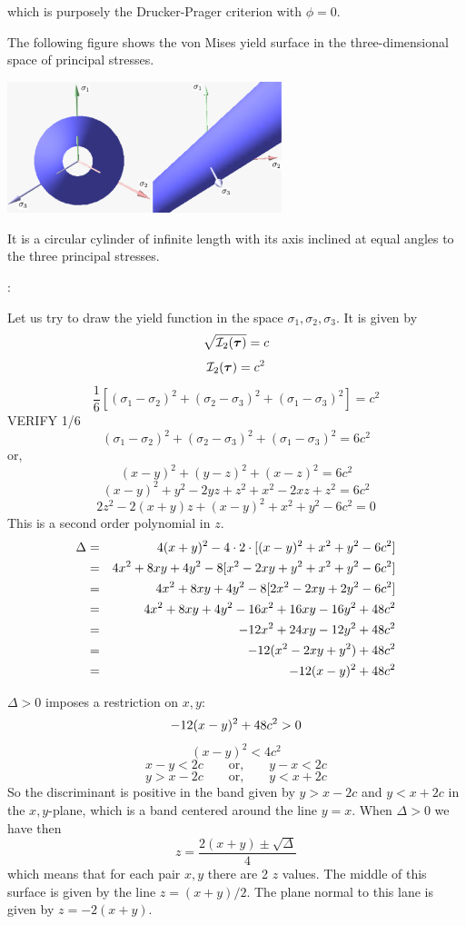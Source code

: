 which is purposely the Drucker-Prager criterion with $\phi=0$.


The following figure shows the von Mises yield surface in the three-dimensional space of principal stresses. 
\begin{center}
\includegraphics[width=0.6\textwidth]{images/rheology/vonmises/vonmises.pdf}
\end{center}
It is a circular cylinder of infinite length with its axis inclined at equal angles to the three principal stresses. 

\Literature: \cite{papa87,long03}

\newpage

Let us try to draw the yield function in the space $\sigma_1,\sigma_2,\sigma_3$. It is given by
\[
\sqrt{ {\cal I}_2({\bm \tau}) } = c 
\]
\[
{\cal I}_2({\bm \tau})  = c^2 
\]
\[
\frac{1}{6}\left[(\sigma_{1}-\sigma_{2})^2 + (\sigma_{2}-\sigma_{3})^2 + (\sigma_{1}-\sigma_{3})^2 \right] 
=c^2
\]
VERIFY 1/6
\[
(\sigma_{1}-\sigma_{2})^2 + (\sigma_{2}-\sigma_{3})^2 + (\sigma_{1}-\sigma_{3})^2 = 6c^2 
\]
or, 
\[
(x-y)^2 + (y-z)^2 + (x-z)^2 = 6c^2 
\]
\[
(x-y)^2 + y^2 - 2yz + z^2 + x^2 -2xz +z^2 = 6c^2
\]
\[
2z^2 - 2(x+y)z + (x-y)^2+x^2+y^2-6c^2 = 0
\]
This is a second order polynomial in $z$. 
\begin{eqnarray}
\Delta 
&=& 4(x+y)^2 - 4 \cdot 2 \cdot [(x-y)^2+x^2+y^2-6c^2] \nonumber\\
&=& 4x^2 + 8xy + 4y^2 - 8 [x^2-2xy+y^2 +x^2+y^2-6c^2] \nonumber\\
&=& 4x^2 + 8xy + 4y^2 - 8 [2x^2-2xy+2y^2 -6c^2] \nonumber\\
&=& 4x^2 + 8xy + 4y^2 - 16x^2+ 16xy -16y^2 +48 c^2 \nonumber\\
&=& -12x^2 + 24xy -12 y^2  +48 c^2 \nonumber\\
&=& -12(x^2 -2xy + y^2)  + 48 c^2 \nonumber\\
&=& -12(x-y)^2  + 48 c^2 \nonumber
\end{eqnarray}

$\Delta >0$ imposes a restriction on $x,y$:
\[
 -12(x-y)^2  + 48 c^2 \nonumber > 0
\]
\[
(x-y)^2  < 4 c^2 
\]
\[
x-y<2c   
\qquad
\text{or,}
\qquad
y-x<2c   
\]
\[
y> x-2c   
\qquad
\text{or,}
\qquad
y<x+2c
\]
So the discriminant is positive in the band given by $y>x-2c$ and $y<x+2c$ in the $x,y$-plane, 
which is a band centered around the line $y=x$.
When $\Delta>0$ we have then 
\[
z= \frac{2(x+y) \pm \sqrt{\Delta}}{4}
\]
which means that for each pair $x,y$ there are 2 $z$ values. 
The middle of this surface is given by the line $z=(x+y)/2$. 
The plane normal to this lane is given by $z=-2(x+y)$.

